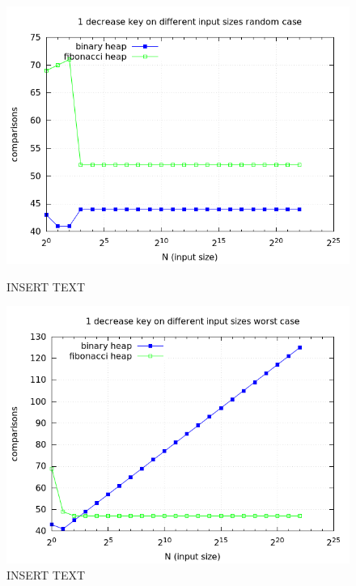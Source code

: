 \documentclass[a4paper,oneside,article,11pt]{memoir}
\begin{document}
\begin{figure}[H]
\centering
\begin{minipage}{0.48\columnwidth}
  \centering
  \includegraphics[width=\linewidth]{../res/dk/dk_random_fixed_size_1.png}%
  \caption{INSERT TEXT}
  \label{fig:dk_del_1_random}
\end{minipage}%
\hfill
\begin{minipage}{0.48\columnwidth}
  \centering
  \includegraphics[width=\linewidth]{../res/dk/dk_worst_fixed_size_1.png}%
  \caption{INSERT TEXT}
  \label{fig:dk_del_1_worst}
\end{minipage}
\end{figure}

\end{document}
